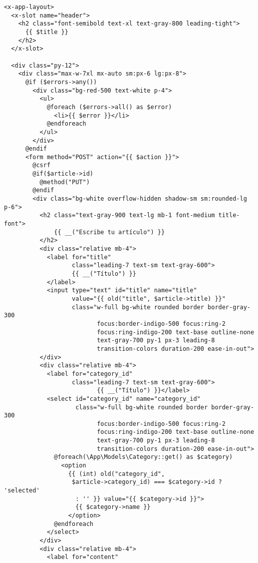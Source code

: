 \documentclass[11pt]{article}
\begin{document}
\begin{verbatim}
<x-app-layout>
  <x-slot name="header">
    <h2 class="font-semibold text-xl text-gray-800 leading-tight">
      {{ $title }}
    </h2>
  </x-slot>

  <div class="py-12">
    <div class="max-w-7xl mx-auto sm:px-6 lg:px-8">
      @if ($errors->any())
        <div class="bg-red-500 text-white p-4">
          <ul>
            @foreach ($errors->all() as $error)
              <li>{{ $error }}</li>
            @endforeach
          </ul>
        </div>
      @endif
      <form method="POST" action="{{ $action }}">
        @csrf
        @if($article->id)
          @method("PUT")
        @endif
        <div class="bg-white overflow-hidden shadow-sm sm:rounded-lg p-6">
          <h2 class="text-gray-900 text-lg mb-1 font-medium title-font">
              {{ __("Escribe tu artículo") }}
          </h2>
          <div class="relative mb-4">
            <label for="title"
                   class="leading-7 text-sm text-gray-600">
                   {{ __("Título") }}
            </label>
            <input type="text" id="title" name="title"
                   value="{{ old("title", $article->title) }}"
                   class="w-full bg-white rounded border border-gray-300
                          focus:border-indigo-500 focus:ring-2
                          focus:ring-indigo-200 text-base outline-none
                          text-gray-700 py-1 px-3 leading-8
                          transition-colors duration-200 ease-in-out">
          </div>
          <div class="relative mb-4">
            <label for="category_id"
                   class="leading-7 text-sm text-gray-600">
                          {{ __("Título") }}</label>
            <select id="category_id" name="category_id"
                    class="w-full bg-white rounded border border-gray-300
                          focus:border-indigo-500 focus:ring-2
                          focus:ring-indigo-200 text-base outline-none
                          text-gray-700 py-1 px-3 leading-8
                          transition-colors duration-200 ease-in-out">
              @foreach(\App\Models\Category::get() as $category)
                <option
                  {{ (int) old("category_id",
                   $article->category_id) === $category->id ? 'selected'
                    : '' }} value="{{ $category->id }}">
                    {{ $category->name }}
                  </option>
              @endforeach
            </select>
          </div>
          <div class="relative mb-4">
            <label for="content"

\end{verbatim}
\end{document}
